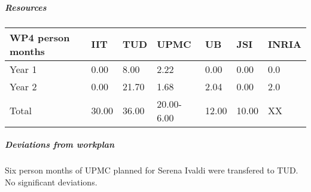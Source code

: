 
\subparagraph{Resources}

\begin{center}
\begin{tabular}{|C{1.5cm}|C{1.5cm}|C{1.5cm}|C{2cm}|C{2cm}|C{2cm}|C{2cm}|}
\hline
\footnotesize \textbf{WP4 person months}& \footnotesize \textbf{IIT}&\footnotesize \textbf{TUD}&\footnotesize \textbf{UPMC}& \footnotesize \textbf{UB} &\footnotesize \textbf{JSI} &\footnotesize \textbf{INRIA}\\ \hline
\footnotesize Year 1 &  0.00 & 8.00 & 2.22 & 0.00 & 0.00 & 0.0     \\  \hline
\footnotesize Year 2 &  0.00 & 21.70 & 1.68 & 2.04 & 0.00 & 2.0     \\  \hline
\footnotesize Total &  30.00 & 36.00 & 20.00-6.00 & 12.00 & 10.00 & XX \\ \hline
\end{tabular}
\end{center}

\subparagraph{Deviations from workplan} 
Six person months of UPMC planned for Serena Ivaldi were transfered to TUD. No significant deviations. 
